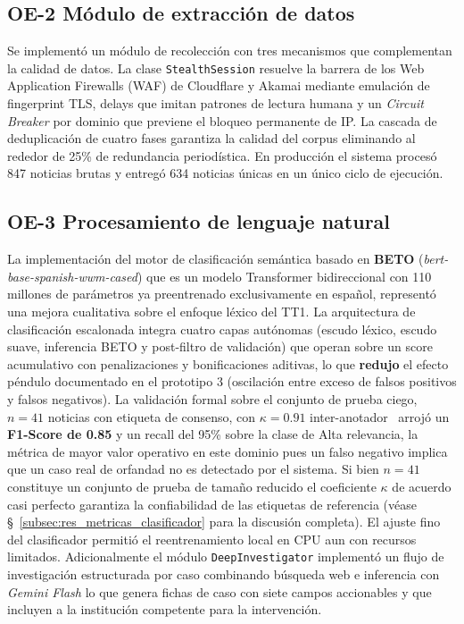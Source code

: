 \subsection*{OE-2 Módulo de extracción de datos}
\label{subsec:conc_oe2}

Se implementó un módulo de recolección con tres mecanismos que complementan la calidad de datos.
La clase \texttt{StealthSession} resuelve la barrera de los Web Application Firewalls (WAF) de
Cloudflare y Akamai mediante emulación de fingerprint TLS, delays que imitan patrones de lectura humana
y un \textit{Circuit Breaker} por dominio que previene el bloqueo permanente de IP.
La cascada de deduplicación de cuatro fases garantiza la calidad del corpus eliminando al rededor de 25\% de redundancia periodística.
En producción el sistema procesó 847 noticias brutas y entregó 634 noticias únicas en un único ciclo de ejecución.

\subsection*{OE-3 Procesamiento de lenguaje natural}
\label{subsec:conc_oe3}

La implementación del motor de clasificación semántica basado en \textbf{BETO}
(\textit{bert-base-spanish-wwm-cased}) que es un modelo Transformer bidireccional
con 110 millones de parámetros ya preentrenado exclusivamente en español, representó
una mejora cualitativa sobre el enfoque léxico del TT1. La arquitectura de clasificación
escalonada integra cuatro capas autónomas (escudo léxico, escudo suave,
inferencia BETO y post-filtro de validación) que operan sobre un score acumulativo
con penalizaciones y bonificaciones aditivas, lo que \textbf{redujo} el efecto péndulo
documentado en el prototipo 3 (oscilación entre exceso de falsos positivos y
falsos negativos). La validación formal sobre el conjunto de prueba ciego,
$n = 41$ noticias con etiqueta de consenso, con \textbf{$\kappa = 0.91$}
inter-anotador~\cite{cohen1960coefficient} arrojó un
\textbf{F1-Score de 0.85} y un recall del 95\% sobre la clase de Alta relevancia,
la métrica de mayor valor operativo en este dominio pues un falso negativo
implica que un caso real de orfandad no es detectado por el sistema. Si bien $n=41$
constituye un conjunto de prueba de tamaño reducido el coeficiente $\kappa$ de
acuerdo casi perfecto garantiza la confiabilidad de las etiquetas de referencia
(véase §~\ref{subsec:res_metricas_clasificador} para la discusión completa).
El ajuste fino del clasificador permitió el reentrenamiento local en CPU aun con
recursos limitados. Adicionalmente el módulo \texttt{DeepInvestigator} implementó
un flujo de investigación estructurada por caso combinando búsqueda web
e inferencia con \textit{Gemini Flash} lo que genera fichas de caso con siete campos
accionables y que incluyen a la institución competente para la intervención.

